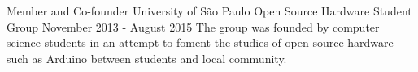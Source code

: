 \documentclass[11pt, a4paper]{awesome-cv-res}
\begin{document}
\begin{cventries}

\cventry
{Member and Co-founder}
{University of São Paulo Open Source Hardware Student Group}
{}
{November 2013 - August 2015}
{The group was founded by computer science students in an attempt to 
foment the studies of open source hardware such as Arduino between 
students and local community. }



\end{cventries}
\end{document}
